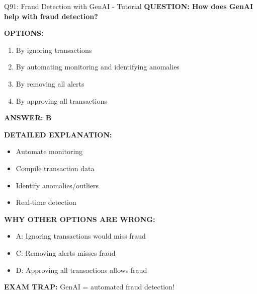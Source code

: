 \documentclass[8pt]{beamer}
\begin{document}
	\begin{frame}{Q91: Fraud Detection with GenAI - Tutorial}
		\fontsize{6.5}{7.5}\selectfont
		\textbf{QUESTION: How does GenAI help with fraud detection?}
		
		\vspace{0.1cm}
		\textbf{OPTIONS:}
		\begin{enumerate}
			\item By ignoring transactions
			\item By automating monitoring and identifying anomalies
			\item By removing all alerts
			\item By approving all transactions
		\end{enumerate}
		
		\vspace{0.1cm}
		\textcolor{myblue}{\textbf{ANSWER: B}}
		
		\vspace{0.1cm}
		\textbf{DETAILED EXPLANATION:}
		\begin{itemize}
			\item Automate monitoring
			\item Compile transaction data
			\item Identify anomalies/outliers
			\item Real-time detection
		\end{itemize}
		
		\vspace{0.1cm}
		\textcolor{myred}{\textbf{WHY OTHER OPTIONS ARE WRONG:}}
		\begin{itemize}
			\item \textcolor{myred}{A:} Ignoring transactions would miss fraud
			\item \textcolor{myred}{C:} Removing alerts misses fraud
			\item \textcolor{myred}{D:} Approving all transactions allows fraud
		\end{itemize}
		
		\textcolor{myred}{\textbf{EXAM TRAP:}} GenAI = \textcolor{myblue}{automated fraud detection}!
	\end{frame}
	
\end{document}
